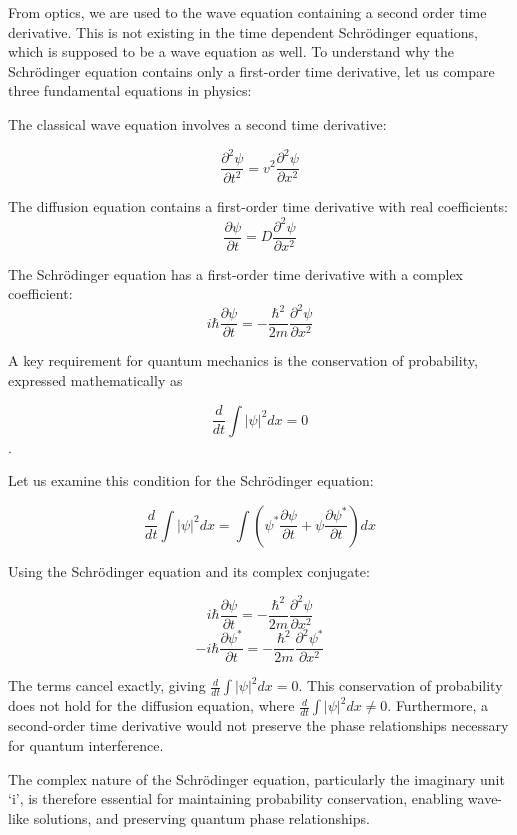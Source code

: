 \documentclass[
  a4paper,
]{book}
\begin{document}
\begin{tcolorbox}[enhanced jigsaw, coltitle=black, title=\textcolor{quarto-callout-note-color}{\faInfo}\hspace{0.5em}{Why First-Order in Time?}, colframe=quarto-callout-note-color-frame, toprule=.15mm, opacitybacktitle=0.6, left=2mm, opacityback=0, breakable, toptitle=1mm, bottomtitle=1mm, leftrule=.75mm, arc=.35mm, titlerule=0mm, colbacktitle=quarto-callout-note-color!10!white, rightrule=.15mm, bottomrule=.15mm, colback=white]

From optics, we are used to the wave equation containing a second order
time derivative. This is not existing in the time dependent Schrödinger
equations, which is supposed to be a wave equation as well. To
understand why the Schrödinger equation contains only a first-order time
derivative, let us compare three fundamental equations in physics:

The classical wave equation involves a second time derivative:

\[\frac{\partial^2 \psi}{\partial t^2} = v^2 \frac{\partial^2 \psi}{\partial x^2}\]

The diffusion equation contains a first-order time derivative with real
coefficients:
\[\frac{\partial \psi}{\partial t} = D \frac{\partial^2 \psi}{\partial x^2}\]

The Schrödinger equation has a first-order time derivative with a
complex coefficient:
\[i\hbar\frac{\partial \psi}{\partial t} = -\frac{\hbar^2}{2m}\frac{\partial^2 \psi}{\partial x^2}\]

A key requirement for quantum mechanics is the conservation of
probability, expressed mathematically as

\[\frac{d}{dt}\int |\psi|^2 dx = 0\].

Let us examine this condition for the Schrödinger equation:

\[\frac{d}{dt}\int |\psi|^2 dx = \int (\psi^* \frac{\partial \psi}{\partial t} + \psi \frac{\partial \psi^*}{\partial t}) dx\]

Using the Schrödinger equation and its complex conjugate:

\[i\hbar\frac{\partial \psi}{\partial t} = -\frac{\hbar^2}{2m}\frac{\partial^2 \psi}{\partial x^2}\]
\[-i\hbar\frac{\partial \psi^*}{\partial t} = -\frac{\hbar^2}{2m}\frac{\partial^2 \psi^*}{\partial x^2}\]

The terms cancel exactly, giving \(\frac{d}{dt}\int |\psi|^2 dx = 0\).
This conservation of probability does not hold for the diffusion
equation, where \(\frac{d}{dt}\int |\psi|^2 dx \neq 0\). Furthermore, a
second-order time derivative would not preserve the phase relationships
necessary for quantum interference.

The complex nature of the Schrödinger equation, particularly the
imaginary unit `i', is therefore essential for maintaining probability
conservation, enabling wave-like solutions, and preserving quantum phase
relationships.

\end{tcolorbox}
\end{document}
